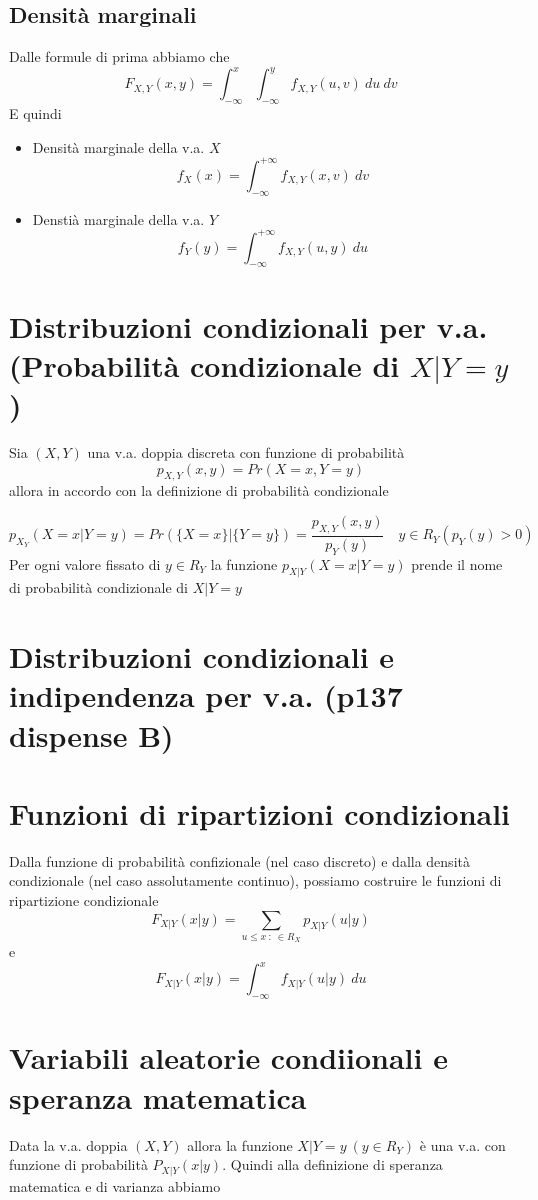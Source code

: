 \documentclass[a4paper]{report}
\begin{document}
  \subsection{Densità marginali}
  Dalle formule di prima abbiamo che
  \[ F_{X,Y}(x,y) = \int_{-\infty}^{x}\int_{-\infty}^{y} f_{X,Y}(u,v)\: du\: dv\]
    E quindi
  \begin{itemize}
    \item Densità marginale della v.a. $X$ \[f_X(x) = \int_{-\infty}^{+\infty} f_{X,Y}(x,v)\: dv\]
    \item Denstià marginale della v.a. $Y$ \[f_Y(y) = \int_{-\infty}^{+\infty} f_{X,Y}(u,y)\: du\]
  \end{itemize}

  \section{Distribuzioni condizionali per v.a. (Probabilità condizionale di $X|Y = y$)}
  Sia $(X,Y)$ una v.a. doppia discreta con funzione di probabilità
  \[ p_{X,Y}(x,y) = Pr(X = x, Y = y) \]
    allora in accordo con la definizione di probabilità condizionale

  \[ p_{X_Y}(X=x|Y=y) = Pr(\{ X=x \}|\{ Y=y \}) = \frac{p_{X,Y}(x,y)}{p_Y(y)} \quad y \in R_Y(p_Y(y)>0) \]
  Per ogni valore fissato di $y \in R_Y$ la funzione $p_{X|Y}(X=x|Y=y)$ prende il nome di probabilità condizionale di $X|Y = y$

  \section{Distribuzioni condizionali e indipendenza per v.a. (p137 dispense B)}

  \section{Funzioni di ripartizioni condizionali}
  Dalla funzione di probabilità confizionale (nel caso discreto) e dalla densità condizionale (nel caso assolutamente continuo), possiamo costruire le funzioni di ripartizione condizionale
  \[ F_{X|Y}(x|y) = \sum_{u \leqslant x \: : \: \in R_X} p_{X|Y}(u|y) \]
  e
  \[ F_{X|Y}(x|y) = \int_{-\infty}^{x} f_{X|Y}(u|y) \: du \]

  \section{Variabili aleatorie condiionali e speranza matematica}
  Data la v.a. doppia $(X,Y)$ allora la funzione $X|Y = y \: (y \in R_Y)$ è una v.a. con funzione di probabilità $P_{X|Y}(x|y)$.
    Quindi alla definizione di speranza matematica e di varianza abbiamo
\end{document}
